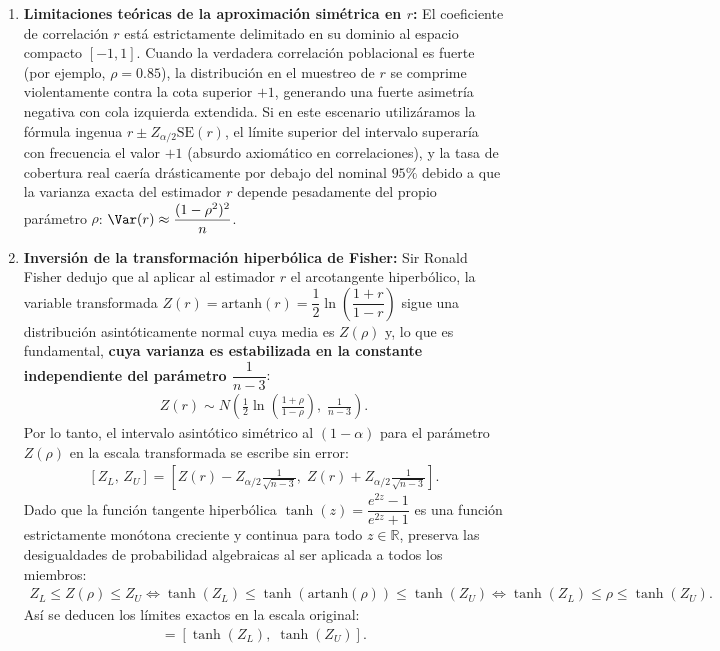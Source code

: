 \begin{solproblema}
	\begin{enumerate}
		\item \textbf{Limitaciones teóricas de la aproximación simétrica en $r$:}
		El coeficiente de correlación $r$ está estrictamente delimitado en su dominio al espacio compacto $[-1, 1]$. Cuando la verdadera correlación poblacional es fuerte (por ejemplo, $\rho = 0.85$), la distribución en el muestreo de $r$ se comprime violentamente contra la cota superior $+1$, generando una fuerte asimetría negativa con cola izquierda extendida. Si en este escenario utilizáramos la fórmula ingenua $r \pm Z_{\alpha/2}\text{SE}(r)$, el límite superior del intervalo superaría con frecuencia el valor $+1$ (absurdo axiomático en correlaciones), y la tasa de cobertura real caería drásticamente por debajo del nominal $95\%$ debido a que la varianza exacta del estimador $r$ depende pesadamente del propio parámetro $\rho$: $\Var(r) \approx \dfrac{(1-\rho^2)^2}{n}$.
		
		\item \textbf{Inversión de la transformación hiperbólica de Fisher:}
		Sir Ronald Fisher dedujo que al aplicar al estimador $r$ el arcotangente hiperbólico, la variable transformada $Z(r) = \text{artanh}(r) = \dfrac{1}{2}\ln\left(\dfrac{1+r}{1-r}\right)$ sigue una distribución asintóticamente normal cuya media es $Z(\rho)$ y, lo que es fundamental, \textbf{cuya varianza es estabilizada en la constante independiente del parámetro $\dfrac{1}{n-3}$}:
		\begin{align}
			Z(r) \sim N\left( \frac{1}{2}\ln\left(\frac{1+\rho}{1-\rho}\right), \; \frac{1}{n-3} \right).
		\end{align}
		Por lo tanto, el intervalo asintótico simétrico al $(1-\alpha)$ para el parámetro $Z(\rho)$ en la escala transformada se escribe sin error:
		\begin{align}
			\left[ Z_L, \, Z_U \right] = \left[ Z(r) - Z_{\alpha/2} \frac{1}{\sqrt{n-3}}, \; Z(r) + Z_{\alpha/2} \frac{1}{\sqrt{n-3}} \right].
		\end{align}
		Dado que la función tangente hiperbólica $\tanh(z) = \dfrac{e^{2z}-1}{e^{2z}+1}$ es una función estrictamente monótona creciente y continua para todo $z \in \mathbb{R}$, preserva las desigualdades de probabilidad algebraicas al ser aplicada a todos los miembros:
		\begin{align}
			Z_L \le Z(\rho) \le Z_U \iff \tanh(Z_L) \le \tanh\left(\text{artanh}(\rho)\right) \le \tanh(Z_U) \iff \tanh(Z_L) \le \rho \le \tanh(Z_U).
		\end{align}
		Así se deducen los límites exactos en la escala original:
		\begin{align}
			[L_\rho, \, U_\rho] = \left[ \tanh(Z_L), \; \tanh(Z_U) \right].
		\end{align}
		

\end{enumerate}
\end{solproblema}
